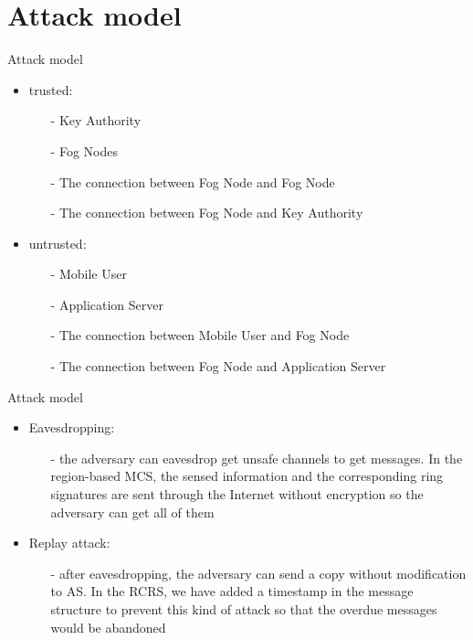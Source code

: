 \documentclass{beamer}
\begin{document}
\section{Attack model}
\begin{frame}{Attack model}
    \begin{itemize}
        \item {trusted:}
        \begin{itemize}
            \item[-] Key Authority
            \item[-] Fog Nodes
            \item[-] The connection between Fog Node and Fog Node
            \item[-] The connection between Fog Node and Key Authority
        \end{itemize}
        \item {untrusted:}
        \begin{itemize}
            \item[-] Mobile User
            \item[-] Application Server
            \item[-] The connection between Mobile User and Fog Node
            \item[-] The connection between Fog Node and Application Server
        \end{itemize}
    \end{itemize}
\end{frame}
\begin{frame}{Attack model}
    \begin{itemize}
        \item {Eavesdropping:}
        \begin{itemize}
            \item[-] the adversary can eavesdrop get unsafe channels to get messages. In the region-based MCS, the sensed information and the corresponding ring signatures are sent through the Internet without encryption so the adversary can get all of them
        \end{itemize}
        \item {Replay attack:}
        \begin{itemize}
            \item[-] after eavesdropping, the adversary can send a copy without modification to AS. In the RCRS, we have added a timestamp in the message structure to prevent this kind of attack so that the overdue messages would be abandoned
        \end{itemize}
    \end{itemize}
\end{frame}
\end{document}

